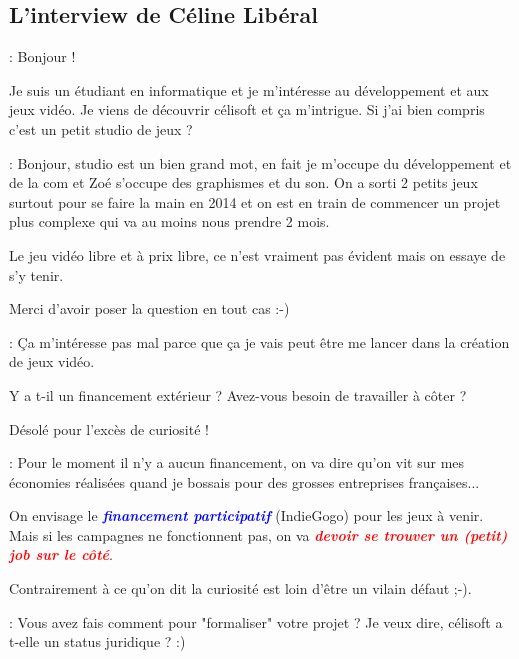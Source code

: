 \documentclass[a4paper,12pt, draft]{report}
\newcommand{\badPoint}[1]{\textcolor{red}{\textbf{\textit{#1}}}}
\newcommand{\importantPoint}[1]{\textcolor{blue}{\textbf{\textit{#1}}}}
\begin{document}
\subsection{L'interview de Céline Libéral}
\begin{description}

\item [Question]: Bonjour !
\item Je suis un étudiant en informatique et je m'intéresse au développement et aux jeux vidéo. Je viens de découvrir célisoft et ça m'intrigue. Si j'ai bien compris c'est un petit studio de jeux ?
\item 
\item [Réponse]: Bonjour, studio est un bien grand mot, en fait je m'occupe du développement et de la com et Zoé s'occupe des graphismes et du son. On a sorti 2 petits jeux surtout pour se faire la main en 2014 et on est en train de commencer un projet plus complexe qui va au moins nous prendre 2 mois.
\item Le jeu vidéo libre et à prix libre, ce n'est vraiment pas évident mais on essaye de s'y tenir.
\item Merci d'avoir poser la question en tout cas :-)
\item 
\item 
\item [Question]: Ça m'intéresse pas mal parce que ça je vais peut être me lancer dans la création de jeux vidéo.
\item Y a t-il un financement extérieur ? Avez-vous besoin de travailler à côter ?
\item Désolé pour l'excès de curiosité !
\item 
\item [Réponse]: Pour le moment il n'y a aucun financement, on va dire qu'on vit sur mes économies réalisées quand je bossais pour des grosses entreprises françaises...
\item On envisage le \importantPoint{financement participatif} (IndieGogo) pour les jeux à venir. Mais si les campagnes ne fonctionnent pas, on va \badPoint{devoir se trouver un (petit) job sur le côté}.
\item 
\item Contrairement à ce qu'on dit la curiosité est loin d'être un vilain défaut ;-).
\item 
\item [Question]: Vous avez fais comment pour "formaliser" votre projet ? Je veux dire, célisoft a t-elle un status juridique ? :)
\item 

\end{description}
\end{document}

